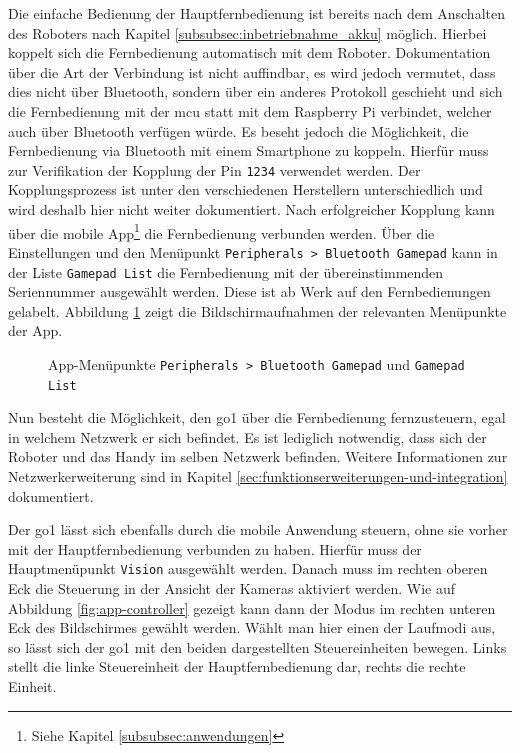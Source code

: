 Die einfache Bedienung der Hauptfernbedienung ist bereits nach dem Anschalten des Roboters nach Kapitel \ref{subsubsec:inbetriebnahme_akku} möglich.
Hierbei koppelt sich die Fernbedienung automatisch mit dem Roboter.
Dokumentation über die Art der Verbindung ist nicht auffindbar, es wird jedoch vermutet, dass dies nicht über Bluetooth,
sondern über ein anderes Protokoll geschieht und sich die Fernbedienung mit der \gls{mcu} statt mit dem Raspberry
Pi verbindet, welcher auch über Bluetooth verfügen würde.
Es beseht jedoch die Möglichkeit, die Fernbedienung via Bluetooth mit einem Smartphone zu koppeln.
Hierfür muss zur Verifikation der Kopplung der Pin \texttt{1234} verwendet werden.
Der Kopplungsprozess ist unter den verschiedenen Herstellern unterschiedlich und wird deshalb hier nicht weiter dokumentiert.
Nach erfolgreicher Kopplung kann über die mobile App\footnote{Siehe Kapitel \ref{subsubsec:anwendungen}} die Fernbedienung verbunden werden.
Über die Einstellungen und den Menüpunkt \texttt{Peripherals > Bluetooth Gamepad} kann in der Liste \texttt{Gamepad List}
die Fernbedienung mit der übereinstimmenden Seriennummer ausgewählt werden.
Diese ist ab Werk auf den Fernbedienungen gelabelt.
Abbildung \ref{fig:controller-app} zeigt die Bildschirmaufnahmen der relevanten Menüpunkte der App.

\begin{figure}[h]
    \caption{App-Menüpunkte \texttt{Peripherals > Bluetooth Gamepad} und \texttt{Gamepad List}}\label{fig:controller-app}
\end{figure}

\noindent Nun besteht die Möglichkeit, den \gls{go1} über die Fernbedienung fernzusteuern, egal in welchem Netzwerk er sich befindet.
Es ist lediglich notwendig, dass sich der Roboter und das Handy im selben Netzwerk befinden.
Weitere Informationen zur Netzwerkerweiterung sind in Kapitel \ref{sec:funktionserweiterungen-und-integration} dokumentiert.


Der \gls{go1} lässt sich ebenfalls durch die mobile Anwendung steuern, ohne sie vorher mit der Hauptfernbedienung verbunden zu haben.
Hierfür muss der Hauptmenüpunkt \texttt{Vision} ausgewählt werden.
Danach muss im rechten oberen Eck die Steuerung in der Ansicht der Kameras aktiviert werden.
Wie auf Abbildung \ref{fig:app-controller} gezeigt kann dann der Modus im rechten unteren Eck des Bildschirmes gewählt werden.
Wählt man hier einen der Laufmodi aus, so lässt sich der \gls{go1} mit den beiden dargestellten Steuereinheiten bewegen.
Links stellt die linke Steuereinheit der Hauptfernbedienung dar, rechts die rechte Einheit.

